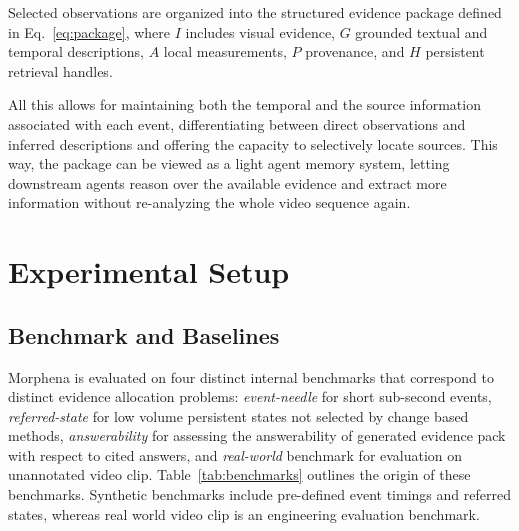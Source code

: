 \documentclass[conference]{IEEEtran}
\begin{document}
Selected observations are organized into the structured evidence package defined in Eq.~\ref{eq:package}, where $I$ includes visual evidence, $G$ grounded textual and temporal descriptions, $A$ local measurements, $P$ provenance, and $H$ persistent retrieval handles.

All this allows for maintaining both the temporal and the source information associated with each event, differentiating between direct observations and inferred descriptions and offering the capacity to selectively locate sources. This way, the package can be viewed as a light agent memory system, letting downstream agents reason over the available evidence and extract more information without re-analyzing the whole video sequence again.


\section{Experimental Setup}

\subsection{Benchmark and Baselines}

Morphena is evaluated on four distinct internal benchmarks that correspond to distinct evidence allocation problems: \textit{event-needle} for short sub-second events, \textit{referred-state} for low volume persistent states not selected by change based methods, \textit{answerability} for assessing the answerability of generated evidence pack with respect to cited answers, and \textit{real-world} benchmark for evaluation on unannotated video clip. Table~\ref{tab:benchmarks} outlines the origin of these benchmarks. Synthetic benchmarks include pre-defined event timings and referred states, whereas real world video clip is an engineering evaluation benchmark.

\begin{table}[t]
\centering
\small
\caption{Benchmark sources used in Section~V.}
\label{tab:benchmarks}
\end{table}
\end{document}
